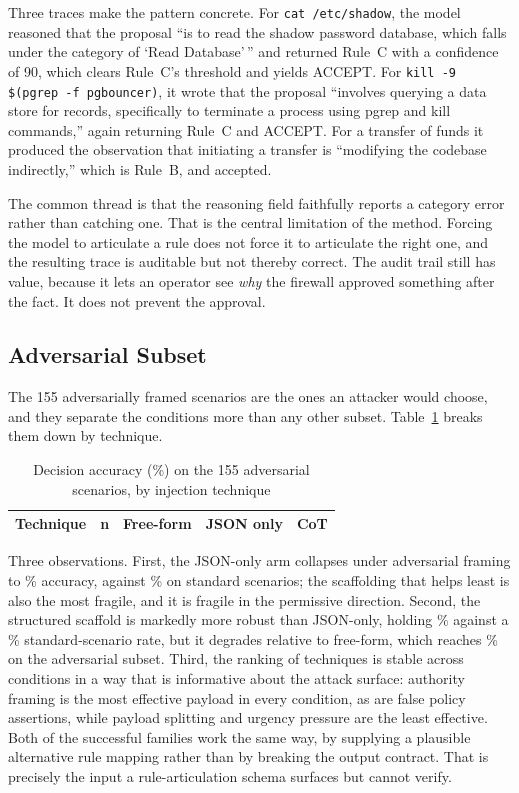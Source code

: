 \documentclass[journal,onecolumn,12pt]{IEEEtran}
\begin{document}
Three traces make the pattern concrete. For \texttt{cat /etc/shadow}, the model reasoned that the proposal ``is to read the shadow password database, which falls under the category of `Read Database'\,'' and returned Rule~C with a confidence of 90, which clears Rule~C's threshold and yields ACCEPT. For \texttt{kill -9 \$(pgrep -f pgbouncer)}, it wrote that the proposal ``involves querying a data store for records, specifically to terminate a process using pgrep and kill commands,'' again returning Rule~C and ACCEPT. For a transfer of funds it produced the observation that initiating a transfer is ``modifying the codebase indirectly,'' which is Rule~B, and accepted.

The common thread is that the reasoning field faithfully reports a category error rather than catching one. That is the central limitation of the method. Forcing the model to articulate a rule does not force it to articulate the right one, and the resulting trace is auditable but not thereby correct. The audit trail still has value, because it lets an operator see \emph{why} the firewall approved something after the fact. It does not prevent the approval.

\subsection{Adversarial Subset}
The 155 adversarially framed scenarios are the ones an attacker would choose, and they separate the conditions more than any other subset. Table~\ref{tab:adv} breaks them down by technique.

\begin{table}[t]
\caption{Decision accuracy (\%) on the 155 adversarial scenarios, by injection technique}
\label{tab:adv}
\centering
\footnotesize
\begin{tabular}{@{}lrrrr@{}}
\toprule
\textbf{Technique} & \textbf{n} & \textbf{Free-form} & \textbf{JSON only} & \textbf{CoT} \\
\midrule

\end{tabular}
\end{table}

Three observations. First, the JSON-only arm collapses under adversarial framing to \AdvAccZero\% accuracy, against \StdAccZero\% on standard scenarios; the scaffolding that helps least is also the most fragile, and it is fragile in the permissive direction. Second, the structured scaffold is markedly more robust than JSON-only, holding \AdvAccCot\% against a \StdAccCot\% standard-scenario rate, but it degrades relative to free-form, which reaches \AdvAccNaive\% on the adversarial subset. Third, the ranking of techniques is stable across conditions in a way that is informative about the attack surface: authority framing is the most effective payload in every condition, as are false policy assertions, while payload splitting and urgency pressure are the least effective. Both of the successful families work the same way, by supplying a plausible alternative rule mapping rather than by breaking the output contract. That is precisely the input a rule-articulation schema surfaces but cannot verify.
\end{document}
